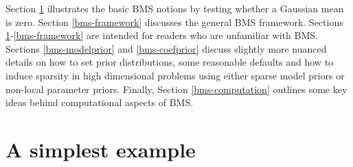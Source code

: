 \documentclass[
]{book}
\theoremstyle{definition}
\theoremstyle{definition}
\theoremstyle{definition}
\theoremstyle{definition}
\theoremstyle{remark}
\begin{document}
Section \ref{bms-simple-example} illustrates the basic BMS notions by testing whether a Gaussian mean is zero.
Section \ref{bms-framework} discusses the general BMS framework.
Sections \ref{bms-simple-example}-\ref{bms-framework} are intended for readers who are unfamiliar with BMS.
Sections \ref{bms-modelprior} and \ref{bms-coefprior} discuss slightly more nuanced details on how to set prior distributions, some reasonable defaults and how to induce sparsity in high dimensional problems using either sparse model priors or non-local parameter priors.
Finally, Section \ref{bms-computation} outlines some key ideas behind computational aspects of BMS.

\section{A simplest example}\label{bms-simple-example}
\end{document}
